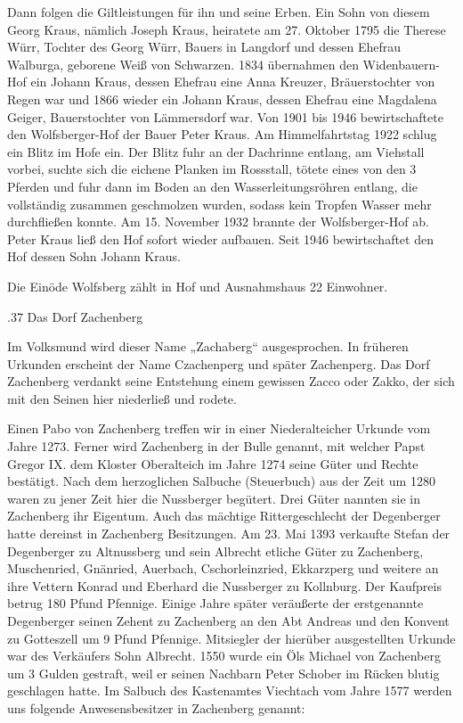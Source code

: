 \documentclass{book}
\begin{document}
Dann folgen die Giltleistungen für ihn und seine Erben. Ein Sohn von diesem
Georg Kraus, nämlich Joseph Kraus, heiratete am 27. Oktober 1795 die Therese
Würr, Tochter des Georg Würr, Bauers in Langdorf und dessen Ehefrau Walburga,
geborene Weiß von Schwarzen. 1834 übernahmen den Widenbauern-Hof ein Johann
Kraus, dessen Ehefrau eine Anna Kreuzer, Bräuerstochter von Regen war und 1866
wieder ein Johann Kraus, dessen Ehefrau eine Magdalena Geiger, Bauerstochter von
Lämmersdorf war. Von 1901 bis 1946 bewirtschaftete den Wolfsberger-Hof der Bauer
Peter Kraus. Am Himmelfahrtstag 1922 schlug ein Blitz im Hofe ein. Der Blitz
fuhr an der Dachrinne entlang, am Viehstall vorbei, suchte sich die eichene
Planken im Rossstall, tötete eines von den 3 Pferden und fuhr dann im Boden an
den Wasserleitungsröhren entlang, die vollständig zusammen geschmolzen wurden,
sodass kein Tropfen Wasser mehr durchfließen konnte. Am 15. November 1932
brannte der Wolfsberger-Hof ab. Peter Kraus ließ den Hof sofort wieder aufbauen.
Seit 1946 bewirtschaftet den Hof dessen Sohn Johann Kraus.

Die Einöde Wolfsberg zählt in Hof und Ausnahmshaus 22 Einwohner.

.37 Das Dorf Zachenberg

Im Volksmund wird dieser Name „Zachaberg“ ausgesprochen. In früheren Urkunden
erscheint der Name Czachenperg und später Zachenperg. Das Dorf Zachenberg
verdankt seine Entstehung einem gewissen Zacco oder Zakko, der sich mit den
Seinen hier niederließ und rodete.

Einen Pabo von Zachenberg treffen wir in einer Niederalteicher Urkunde vom Jahre
1273. Ferner wird Zachenberg in der Bulle genannt, mit welcher Papst Gregor IX.
dem Kloster Oberalteich im Jahre 1274 seine Güter und Rechte bestätigt. Nach dem
herzoglichen Salbuche (Steuerbuch) aus der Zeit um 1280 waren zu jener Zeit hier
die Nussberger begütert. Drei Güter nannten sie in Zachenberg ihr Eigentum. Auch
das mächtige Rittergeschlecht der Degenberger hatte dereinst in Zachenberg
Besitzungen. Am 23. Mai 1393 verkaufte Stefan der Degenberger zu Altnussberg und
sein Albrecht etliche Güter zu Zachenberg, Muschenried, Gnänried, Auerbach,
Cschorleinzried, Ekkarzperg und weitere an ihre Vettern Konrad und Eberhard die
Nussberger zu Kollnburg. Der Kaufpreis betrug 180 Pfund Pfennige. Einige Jahre
später veräußerte der erstgenannte Degenberger seinen Zehent zu Zachenberg an
den Abt Andreas und den Konvent zu Gotteszell um 9 Pfund Pfennige. Mitsiegler
der hierüber ausgestellten Urkunde war des Verkäufers Sohn Albrecht. 1550 wurde
ein Öls Michael von Zachenberg um 3 Gulden gestraft, weil er seinen Nachbarn
Peter Schober im Rücken blutig geschlagen hatte. Im Salbuch des Kastenamtes
Viechtach vom Jahre 1577 werden uns folgende Anwesensbesitzer in Zachenberg
genannt:
\end{document}
